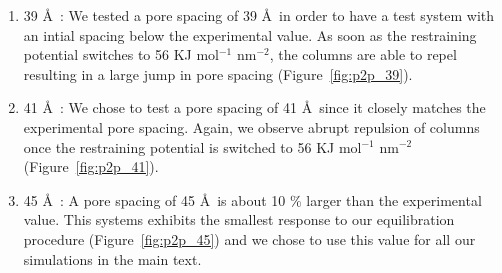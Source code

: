 \documentclass[journal=jpcbfk,manusciprt=article]{achemso}
\begin{document}

	  \begin{enumerate}

		\item 39 \AA~: We tested a pore spacing of 39 \AA~in order to
		have a test system with an intial spacing below the experimental value. As soon
		as the restraining potential switches to 56 KJ mol$^{-1}$ nm$^{-2}$, the
		columns are able to repel resulting in a large jump in pore spacing
		(Figure~\ref{fig:p2p_39}). %

		\item 41 \AA~: We chose to test a pore spacing of 41 \AA~since
		it closely matches the experimental pore spacing. Again, we observe abrupt
		repulsion of columns once the restraining potential is switched to 56 KJ
		mol$^{-1}$ nm$^{-2}$ (Figure~\ref{fig:p2p_41}). %

		\item 45 \AA~: A pore spacing of 45 \AA~is about 10 \% larger
		than the experimental value. This systems exhibits the smallest response to our 
 		equilibration procedure (Figure~\ref{fig:p2p_45}) and we chose to use this
        value for all our simulations in the main text.


\end{enumerate}
\end{document}
